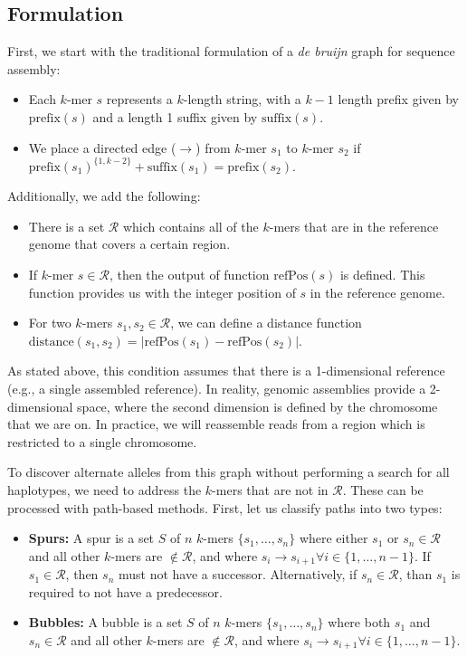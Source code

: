 \documentclass[masters]{ucbthesis}
\begin{document}
\subsection{Formulation}

First, we start with the traditional formulation of a \emph{de bruijn} graph for sequence assembly:

\begin{itemize}
\item Each $k$-mer $s$ represents a $k$-length string, with a $k - 1$ length prefix given by
$\text{prefix}(s)$ and a length 1 suffix given by $\text{suffix}(s)$.
\item We place a directed edge ($\rightarrow$) from $k$-mer $s_1$ to $k$-mer $s_2$ if
$\text{prefix}(s_1)^{\{1, k - 2\}} + \text{suffix}(s_1) = \text{prefix}(s_2)$.
\end{itemize}

Additionally, we add the following:

\begin{itemize}
\item There is a set $\mathcal{R}$ which contains all of the $k$-mers that are in the reference
genome that covers a certain region.
\item If $k$-mer $s \in \mathcal{R}$, then the output of function $\text{refPos}(s)$ is defined.
This function provides us with the integer position of $s$ in the reference genome.
\item For two $k$-mers $s_1, s_2 \in \mathcal{R}$, we can define a distance function
$\text{distance}(s_1, s_2) = | \text{refPos}(s_1) - \text{refPos}(s_2) |$.
\end{itemize}

As stated above, this condition assumes that there is a 1-dimensional reference (e.g., a single
assembled reference). In reality, genomic assemblies provide a 2-dimensional space, where the
second dimension is defined by the chromosome that we are on. In practice, we will reassemble
reads from a region which is restricted to a single chromosome.

To discover alternate alleles from this graph without performing a search for all haplotypes,
we need to address the $k$-mers that are not in $\mathcal{R}$. These can be processed with
path-based methods. First, let us classify paths into two types:

\begin{itemize}
\item \textbf{Spurs:} A spur is a set $S$ of $n$ $k$-mers $\{s_1, \dots, s_n\}$ where either $s_1$ or
$s_n \in \mathcal{R}$ and all other $k$-mers are $\not\in \mathcal{R}$, and where
$s_i \rightarrow s_{i + 1} \forall i \in \{1, \dots, n - 1\}$. If $s_1 \in \mathcal{R}$,
then $s_n$ must not have a successor. Alternatively, if $s_n \in \mathcal{R}$, than $s_1$ is
required to not have a predecessor.
\item \textbf{Bubbles:} A bubble is a set $S$ of $n$ $k$-mers $\{s_1, \dots, s_n\}$ where both
$s_1$ and $s_n \in \mathcal{R}$ and all other $k$-mers are $\not\in \mathcal{R}$, and where
$s_i \rightarrow s_{i + 1} \forall i \in \{1, \dots, n - 1\}$.
\end{itemize}
\end{document}
